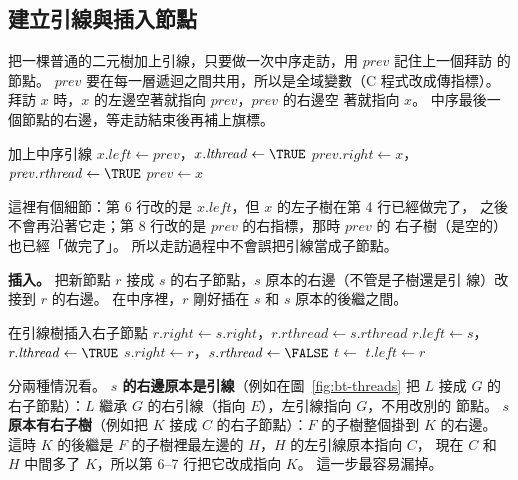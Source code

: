 \subsection{建立引線與插入節點}

把一棵普通的二元樹加上引線，只要做一次中序走訪，用 $\mathit{prev}$ 記住上一個拜訪
的節點。 $\mathit{prev}$ 要在每一層遞迴之間共用，所以是全域變數（C 程式改成傳指標）。
拜訪 $x$ 時，$x$ 的左邊空著就指向 $\mathit{prev}$，$\mathit{prev}$ 的右邊空
著就指向 $x$。 中序最後一個節點的右邊，等走訪結束後再補上旗標。

\begin{pseudo}[label=alg:bt-make-threads]{加上中序引線}
 
        \State \Return
    \EndIf
    \State {}
        \State $x.\mathit{left} \gets \mathit{prev}$，$x.\mathit{lthread} \gets \TRUE$
    \EndIf
        \State $\mathit{prev}.\mathit{right} \gets x$，$\mathit{prev}.\mathit{rthread} \gets \TRUE$
    \EndIf
    \State $\mathit{prev} \gets x$
    \State {}
\EndProcedure
\end{pseudo}

這裡有個細節：第 6 行改的是 $x.\mathit{left}$，但 $x$ 的左子樹在第 4 行已經做完了，
之後不會再沿著它走；第 8 行改的是 $\mathit{prev}$ 的右指標，那時 $\mathit{prev}$ 的
右子樹（是空的）也已經「做完了」。 所以走訪過程中不會誤把引線當成子節點。

\textbf{插入。} 把新節點 $r$ 接成 $s$ 的右子節點，$s$ 原本的右邊（不管是子樹還是引
線）改接到 $r$ 的右邊。 在中序裡，$r$ 剛好插在 $s$ 和 $s$ 原本的後繼之間。

\begin{pseudo}[label=alg:bt-insert-right]{在引線樹插入右子節點}
    \State $r.\mathit{right} \gets s.\mathit{right}$，$r.\mathit{rthread} \gets s.\mathit{rthread}$
    \State $r.\mathit{left} \gets s$，$r.\mathit{lthread} \gets \TRUE$ 
    \State $s.\mathit{right} \gets r$，$s.\mathit{rthread} \gets \FALSE$
     
        \State $t \gets$ 
        \State $t.\mathit{left} \gets r$ 
    \EndIf
\EndProcedure
\end{pseudo}

分兩種情況看。 \textbf{$s$ 的右邊原本是引線}（例如在圖~\ref{fig:bt-threads} 把 $L$
接成 $G$ 的右子節點）：$L$ 繼承 $G$ 的右引線（指向 $E$），左引線指向 $G$，不用改別的
節點。 \textbf{$s$ 原本有右子樹}（例如把 $K$ 接成 $C$ 的右子節點）：$F$ 的子樹整個掛到
$K$ 的右邊。 這時 $K$ 的後繼是 $F$ 的子樹裡最左邊的 $H$，$H$ 的左引線原本指向 $C$，
現在 $C$ 和 $H$ 中間多了 $K$，所以第 6--7 行把它改成指向 $K$。 這一步最容易漏掉。

